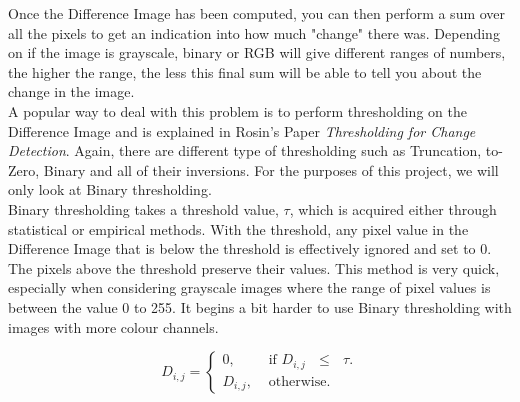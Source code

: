 \documentclass[11pt]{article}
\begin{document}
Once the Difference Image has been computed, you can then perform a 
sum over all the pixels to get an indication into how much "change"
there was. Depending on if the image is grayscale, binary or RGB will
give different ranges of numbers, the higher the range, the less
this final sum will be able to tell you about the change in the image.
\\
A popular way to deal with this problem is to perform thresholding on
the Difference Image and is explained in Rosin's Paper
\textit{Thresholding for Change Detection}\cite{Rosin}. 
Again, there are different type of thresholding
such as Truncation, to-Zero, Binary and all of their inversions. 
For the purposes of this project, we will only look at Binary 
thresholding. \\

Binary thresholding takes a threshold value, $\tau$, which is 
acquired either through statistical or empirical methods. With
the threshold, any pixel value in the Difference Image that is below
the threshold is effectively ignored and set to 0. The pixels above
the threshold preserve their values. This method is very quick,
especially when considering grayscale images where the range of
pixel values is between the value 0 to 255. It begins a bit harder
to use Binary thresholding with images with more colour channels.

\begin{equation}
	D_{i,j} = 
	\begin{cases}
	0, & \text{ if $D_{i,j}$ $\leq$ $\tau$}. \\
	D_{i,j}, & \text{ otherwise}.
	\end{cases}
\end{equation}
\end{document}
